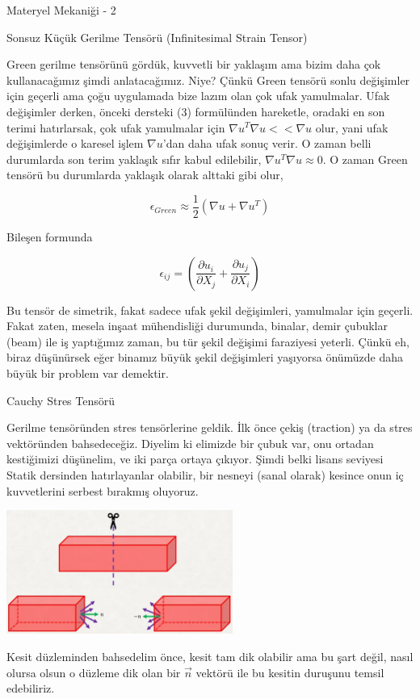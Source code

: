 \documentclass[12pt,fleqn]{article}\usepackage{../../common}
\begin{document}
Materyel Mekaniği - 2

Sonsuz Küçük Gerilme Tensörü (Infinitesimal Strain Tensor)

Green gerilme tensörünü gördük, kuvvetli bir yaklaşım ama bizim daha çok
kullanacağımız şimdi anlatacağımız. Niye? Çünkü Green tensörü sonlu değişimler
için geçerli ama çoğu uygulamada bize lazım olan çok ufak yamulmalar. Ufak
değişimler derken, önceki dersteki (3) formülünden hareketle, oradaki en son
terimi hatırlarsak, çok ufak yamulmalar için $\nabla u^T \nabla u << \nabla u$
olur, yani ufak değişimlerde o karesel işlem $\nabla u$'dan daha ufak sonuç
verir. O zaman belli durumlarda son terim yaklaşık sıfır kabul edilebilir,
$\nabla u^T \nabla u \approx 0$. O zaman Green tensörü bu durumlarda yaklaşık
olarak alttaki gibi olur,

$$
\epsilon_{Green} \approx \frac{1}{2} (\nabla u + \nabla u^T )
$$

Bileşen formunda

$$
\epsilon_{ij} = \left(
\frac{\partial u_i}{\partial X_j} + \frac{\partial u_j}{\partial X_i}
\right)
$$

Bu tensör de simetrik, fakat sadece ufak şekil değişimleri, yamulmalar için
geçerli. Fakat zaten, mesela inşaat mühendisliği durumunda, binalar, demir
çubuklar (beam) ile iş yaptığımız zaman, bu tür şekil değişimi faraziyesi
yeterli. Çünkü eh, biraz düşünürsek eğer binamız büyük şekil değişimleri
yaşıyorsa önümüzde daha büyük bir problem var demektir.

Cauchy Stres Tensörü

Gerilme tensöründen stres tensörlerine geldik. İlk önce çekiş (traction) ya da
stres vektöründen bahsedeceğiz. Diyelim ki elimizde bir çubuk var, onu ortadan
kestiğimizi düşünelim, ve iki parça ortaya çıkıyor. Şimdi belki lisans seviyesi
Statik dersinden hatırlayanlar olabilir, bir nesneyi (sanal olarak) kesince onun
iç kuvvetlerini serbest bırakmış oluyoruz. 

\includegraphics[width=20em]{phy_020_strs_02_01.png}

Kesit düzleminden bahsedelim önce, kesit tam dik olabilir ama bu şart değil,
nasıl olursa olsun o düzleme dik olan bir $\vec{n}$ vektörü ile bu kesitin
duruşunu temsil edebiliriz. 
\end{document}
